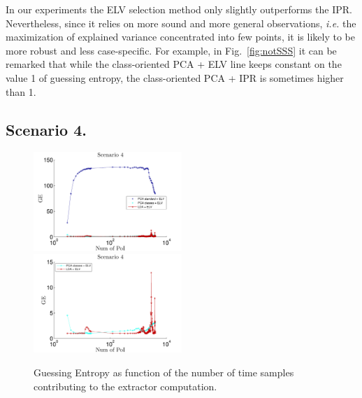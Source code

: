 \begin{remark}
In our experiments the ELV selection method only slightly outperforms the IPR. Nevertheless, since it relies on more sound and more general observations, {\em i.e.} the maximization of explained variance concentrated into few points, it is likely to be more robust and less case-specific. For example, in Fig.~\ref{fig:notSSS} it can be remarked that while the class-oriented PCA + ELV line keeps constant on the value 1 of guessing entropy, the class-oriented PCA + IPR is sometimes higher than 1.
\end{remark}

\subsection{Scenario 4.}

\begin{figure}
\includegraphics[width=0.5\textwidth]{../Figures/CARDIS2015/Criterion4.pdf}
\includegraphics[width=0.5\textwidth]{../Figures/CARDIS2015/Criterion4cutted.pdf} 
\caption{Guessing Entropy as function of the number of time samples contributing to the extractor computation.}\label{fig:4}
\end{figure}


